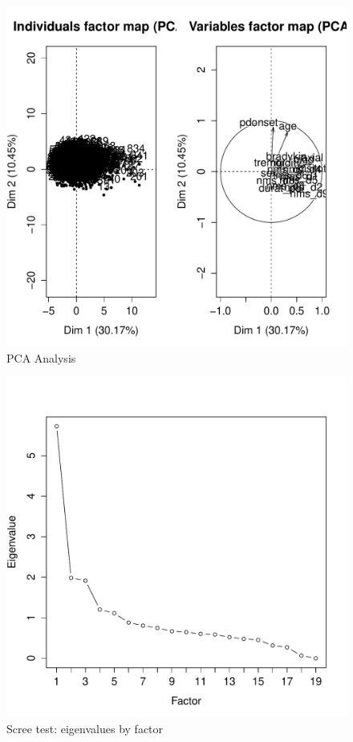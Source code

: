 \documentclass[letterpaper,12pt]{article}
\begin{document}
\begin{figure}[h]
  \centering
  \includegraphics[width=\linewidth]{pca.pdf}
  \caption{PCA Analysis}
  \label{fig:pca}
\end{figure}

\begin{figure}[h]
  \centering
  \includegraphics[width=\linewidth]{pca-eigenvalues.pdf}
  \caption{Scree test: eigenvalues by factor}
  \label{fig:pca-eigenvalues}
\end{figure}
\end{document}
